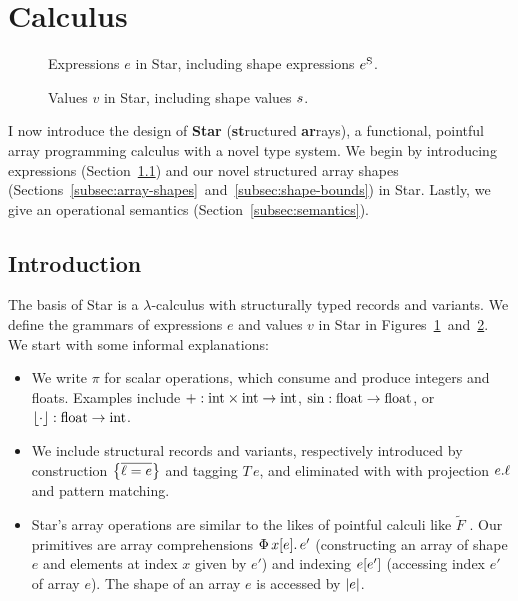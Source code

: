 \section{Calculus}
\label{sec:calculus}

\begin{figure}
    \centering
    
    \caption{Expressions $e$ in Star, including shape expressions ${e^\mathrm{S}}$.}
    \label{fig:star-expressions}
\end{figure}

\begin{figure}
    \centering
    
    \caption{Values $v$ in Star, including shape values $s$.}
    \label{fig:star-values}
\end{figure}

I now introduce the design of \textbf{Star} (\textbf{st}ructured \textbf{ar}rays), a functional, pointful array programming calculus with a novel type system. We begin by introducing expressions (Section~\ref{subsec:star-intro}) and our novel structured array shapes (Sections~\ref{subsec:array-shapes}~and~\ref{subsec:shape-bounds}) in Star.
Lastly, we give an operational semantics  (Section~\ref{subsec:semantics}).

\subsection{Introduction}
\label{subsec:star-intro}

The basis of Star is a $\lambda$-calculus with structurally typed records and variants. We define the grammars of expressions $e$ and values $v$ in Star in Figures~\ref{fig:star-expressions}~and~\ref{fig:star-values}.
We start with some informal explanations:

\begin{itemize}
    \item We write $\pi$ for scalar operations, which consume and produce integers and floats. Examples include $+: \mathrm{int} \times \mathrm{int} \to \mathrm{int}$, $\mathrm{sin} : \mathrm{float} \to \mathrm{float}$, or $\lfloor \cdot \rfloor : \mathrm{float} \to \mathrm{int}$.
    \item We include structural records and variants, respectively introduced by construction $\srecordval{\overline{\ell = e}}$ and tagging $T\,e$, and eliminated with with projection ${e}{.}{\ell}$ and pattern matching. 
    \item Star's array operations are similar to the likes of pointful calculi like $\tilde F$ \cite{f-smooth}. Our primitives are array comprehensions $\sbuild{x}{e}{e'}$ (constructing an array of shape $e$ and elements at index $x$ given by $e'$) and indexing $\sindex{e}{e'}$ (accessing index $e'$ of array $e$).
    The shape of an array $e$ is accessed by $\sshape{e}$.
\end{itemize}


